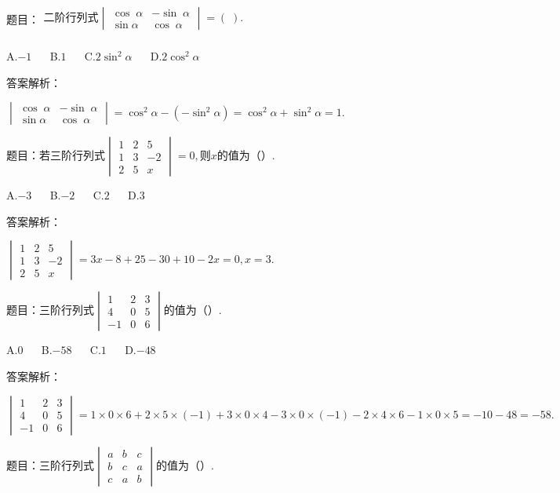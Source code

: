 题目：$\begin{array}{l}\mathrm{二阶行列式}\begin{vmatrix}\cos\;\alpha&-\sin\;\alpha\\\sin\alpha&\cos\;\alpha\end{vmatrix}=(\;).\;\\\end{array}$

A.$-1$ $\quad$ B.$1$ $\quad$ C.$2\sin^2\alpha$ $\quad$ D.$2\cos^2\alpha$

答案解析：

$\begin{vmatrix}\cos\;\alpha&-\sin\;\alpha\\\sin\alpha&\cos\;\alpha\end{vmatrix}=\cos^2\alpha-(-\sin^2\alpha)=\cos^2\alpha+\sin^2\alpha=1.$



题目：$\mathrm{若三阶行列式}\begin{vmatrix}1&2&5\\1&3&-2\\2&5&x\end{vmatrix}=0,则x\mathrm{的值为}（）.$

A.$-3$ $\quad$ B.$-2$ $\quad$ C.$2$ $\quad$ D.$3$

答案解析：

$\begin{vmatrix}1&2&5\\1&3&-2\\2&5&x\end{vmatrix}=3x-8+25-30+10-2x=0,x=3.$



题目：$\mathrm{三阶行列式}\begin{vmatrix}1&2&3\\4&0&5\\-1&0&6\end{vmatrix}\mathrm{的值为}（）.$

A.$0$ $\quad$ B.$-58$ $\quad$ C.$1$ $\quad$ D.$-48$

答案解析：

$\begin{vmatrix}1&2&3\\4&0&5\\-1&0&6\end{vmatrix}=1\times0\times6+2\times5\times(-1)+3\times0\times4-3\times0\times(-1)-2\times4\times6-1\times0\times5=-10-48=-58.$



题目：$\mathrm{三阶行列式}\begin{vmatrix}a&b&c\\b&c&a\\c&a&b\end{vmatrix}\mathrm{的值为}（）.$

